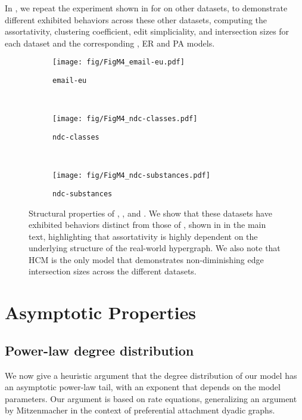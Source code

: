 In , we repeat the experiment shown in   for  on other datasets, to demonstrate different exhibited behaviors across these other datasets, computing the assortativity, clustering coefficient, edit simpliciality, and intersection sizes for each dataset and the corresponding \model, ER and PA models.

\begin{figure*}[!ht]
\centering
   \begin{subfigure}[b]{1\textwidth}
   \texttt{[image: fig/FigM4\_email-eu.pdf]}
   \caption{\texttt{email-eu}}
   \label{fig:additionalM4a} 
\end{subfigure}
\\
\begin{subfigure}[b]{1\textwidth}
   \texttt{[image: fig/FigM4\_ndc-classes.pdf]}
   \caption{\texttt{ndc-classes}}
   \label{fig:additionalM4b} 
\end{subfigure}
\\
\begin{subfigure}[b]{1\textwidth}
   \texttt{[image: fig/FigM4\_ndc-substances.pdf]}
   \caption{\texttt{ndc-substances}}
   \label{fig:additionalM4c} 
\end{subfigure}
\caption{Structural properties of , , and . We show that these datasets have exhibited behaviors distinct from those of , shown in  in the main text, highlighting that assortativity is highly dependent on the underlying structure of the real-world hypergraph. We also note that HCM is the only model that demonstrates non-diminishing edge intersection sizes across the different datasets.}
    \label{fig:additionalM4}
\end{figure*}




\section{Asymptotic Properties}



\subsection{Power-law degree distribution} \label{sec:power-law-tails}


We now give a heuristic argument that the degree distribution of our model has an asymptotic power-law tail, with an exponent that depends on the model parameters. 
Our argument is based on rate equations, generalizing an argument by Mitzenmacher \cite{mitzenmacherBriefHistoryGenerative2004} in the context of preferential attachment dyadic graphs. 

